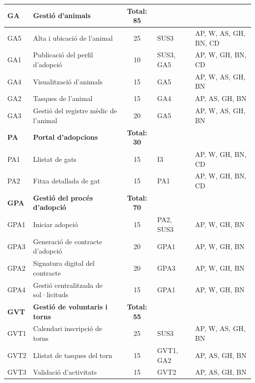 \documentclass[11pt,a4paper]{report}
\begin{document}
\begin{table}[H]
\begin{tabular}{|l|l|c|l|l|}
        \rowcolor{gray!10}
        \textbf{GA} & \textbf{Gestió d'animals} & \textbf{Total: 85} & & \\
        \hline
        GA5 & Alta i ubicació de l'animal & 25 & SUS3 & AP, W, AS, GH, BN, CD \\
        \hline
        GA1 & Publicació del perfil d'adopció & 10 & SUS3, GA5 & AP, W, GH, BN, CD \\
        \hline
        GA4 & Visualització d'animals & 15 & GA5 & AP, W, AS, GH, BN \\
        \hline
        GA2 & Tasques de l'animal & 15 & GA4 & AP, AS, GH, BN \\
        \hline
        GA3 & Gestió del registre mèdic de l'animal & 20 & GA5 & AP, W, AS, GH, BN \\
        \hline

        \rowcolor{gray!10}
        \textbf{PA} & \textbf{Portal d'adopcions} & \textbf{Total: 30} & & \\
        \hline
        PA1 & Llistat de gats & 15 & I3 & AP, W, GH, BN, CD \\
        \hline
        PA2 & Fitxa detallada de gat & 15 & PA1 & AP, W, GH, BN, CD \\
        \hline

        \rowcolor{gray!10}
        \textbf{GPA} & \textbf{Gestió del procés d'adopció} & \textbf{Total: 70} & & \\
        \hline
        GPA1 & Iniciar adopció & 15 & PA2, SUS3 & AP, W, GH, BN \\
        \hline
        GPA3 & Generació de contracte d'adopció & 20 & GPA1 & AP, W, GH, BN \\
        \hline
        GPA2 & Signatura digital del contracte & 20 & GPA3 & AP, W, GH, BN \\
        \hline
        GPA4 & Gestió centralitzada de sol·licituds & 15 & GPA1 & AP, W, GH, BN \\
        \hline

        \rowcolor{gray!10}
        \textbf{GVT} & \textbf{Gestió de voluntaris i torns} & \textbf{Total: 55} & & \\
        \hline
        GVT1 & Calendari inscripció de torns & 25 & SUS3 & AP, W, AS, GH, BN \\
        \hline
        GVT2 & Llistat de tasques del torn & 15 & GVT1, GA2 & AP, AS, GH, BN \\
        \hline
        GVT3 & Validació d'activitats & 15 & GVT2 & AP, AS, GH, BN \\
        \hline


\end{tabular}
\end{table}
\end{document}
